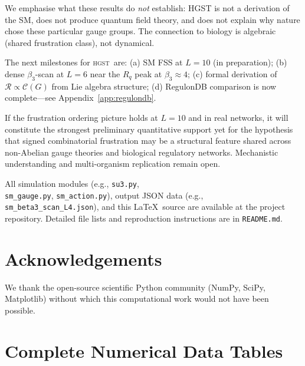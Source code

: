 \documentclass[12pt,a4paper]{article}
\newcommand{\R}{\mathcal{R}}           %
\newcommand{\hgst}{\textsc{hgst}}
\theoremstyle{plain}
\theoremstyle{definition}
\theoremstyle{remark}
\begin{document}
We emphasise what these results do \emph{not} establish: HGST is not a derivation of
the SM, does not produce quantum field theory, and does not explain why
nature chose these particular gauge groups.
The connection to biology is algebraic (shared frustration class), not dynamical.

The next milestones for \hgst\ are:
(a) SM FSS at $L=10$ (in preparation);
(b) dense $\beta_3$-scan at $L=6$ near the $R_q$ peak at $\beta_3\approx4$;
(c) formal derivation of $\R\propto\mathcal{C}(G)$ from Lie algebra structure;
(d) RegulonDB comparison is now complete---see Appendix~\ref{app:regulondb}.

If the frustration ordering picture holds at $L=10$ and in real networks,
it will constitute the strongest preliminary quantitative support yet for
the hypothesis that signed combinatorial frustration may be a structural feature
shared across non-Abelian gauge theories and biological regulatory networks.
Mechanistic understanding and multi-organism replication remain open.

All simulation modules (e.g., \texttt{su3.py}, \\
\texttt{sm\_gauge.py}, \texttt{sm\_action.py}), 
output JSON data (e.g., \\
\texttt{sm\_beta3\_scan\_L4.json}), 
and this \LaTeX\ source are available at the project repository.
Detailed file lists and reproduction instructions are in \texttt{README.md}.

\section*{Acknowledgements}

We thank the open-source scientific Python community (NumPy, SciPy, Matplotlib) without
which this computational work would not have been possible.




\appendix

\section{Complete Numerical Data Tables}
\label{app:data}
\end{document}
